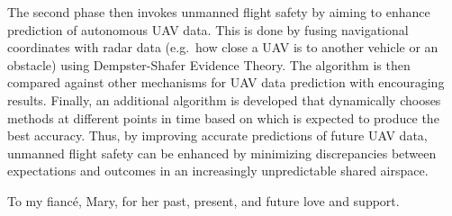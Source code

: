 \documentclass[12pt]{uthesis-v12}  %
\begin{document}
\begin{abstractpage}
The second phase then invokes unmanned flight safety by aiming to enhance prediction of autonomous UAV data. This is done by fusing navigational coordinates with radar data (e.g.~how close a UAV is to another vehicle or an obstacle) using Dempster-Shafer Evidence Theory. The algorithm is then compared against other mechanisms for UAV data prediction with encouraging results. Finally, an additional algorithm is developed that dynamically chooses methods at different points in time based on which is expected to produce the best accuracy. Thus, by improving accurate predictions of future UAV data, unmanned flight safety can be enhanced by minimizing discrepancies between expectations and outcomes in an increasingly unpredictable shared airspace.

\end{abstractpage}


\begin{dedication}
\noindent To my fianc\'e, Mary, for her past, present, and future love and support.
\end{dedication}

\end{document}
